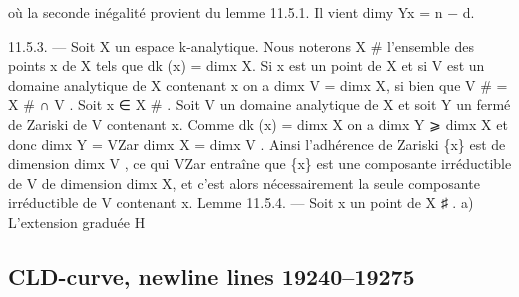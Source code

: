 \documentclass[
  10pt,
]{article}
\newenvironment{Shaded}{}{}
\newcommand{\NormalTok}[1]{#1}
\begin{document}
\begin{Shaded}
\begin{Highlighting}[]
\NormalTok{où la seconde inégalité provient du lemme 11.5.1. Il vient dimy Yx = n − d.}

\NormalTok{11.5.3. — Soit X un espace k{-}analytique. Nous noterons X \# l’ensemble des points x}
\NormalTok{de X tels que dk (x) = dimx X. Si x est un point de X et si V est un domaine analytique}
\NormalTok{de X contenant x on a dimx V = dimx X, si bien que V \# = X \# ∩ V .}
\NormalTok{  Soit x ∈ X \# . Soit V un domaine analytique de X et soit Y un fermé de Zariski}
\NormalTok{de V contenant x. Comme dk (x) = dimx X on a dimx Y ⩾ dimx X et donc dimx Y =}
\NormalTok{                                                    VZar}
\NormalTok{dimx X = dimx V . Ainsi l’adhérence de Zariski \{x\}       est de dimension dimx V , ce qui}
\NormalTok{                 VZar}
\NormalTok{entraîne que \{x\}      est une composante irréductible de V de dimension dimx X, et c’est}
\NormalTok{alors nécessairement la seule composante irréductible de V contenant x.}
\NormalTok{Lemme 11.5.4. — Soit x un point de X ♯ .}
\NormalTok{  a) L’extension graduée H}
\end{Highlighting}
\end{Shaded}

\subsection{CLD-curve, newline lines
19240--19275}\label{cld-curve-newline-lines-1924019275}
\end{document}
